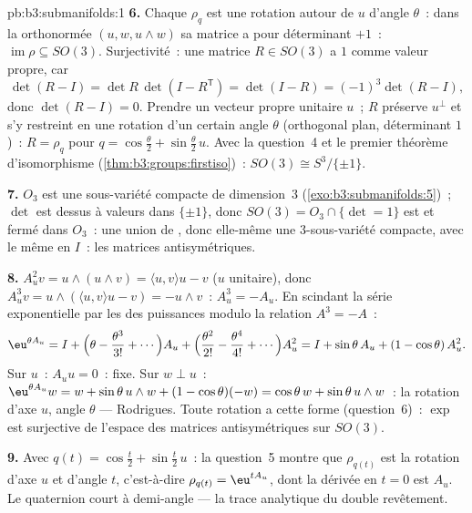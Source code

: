 \begin{solution}{pb:b3:submanifolds:1}
\textbf{6.} Chaque $\rho_q$ est une rotation autour de $u$
d'angle $\theta$~: dans la  orthonormée $(u, w,
u\wedge w)$ sa matrice a pour déterminant $+1$~:
$\operatorname{im}\rho \subseteq SO(3)$. Surjectivité~: une
matrice $R \in SO(3)$ a $1$ comme valeur propre, car
\[
\det(R - I) = \det R\,\det(I - R^{\mathsf T}) = \det(I - R)
= (-1)^3\det(R - I),
\]
donc $\det(R - I) = 0$. Prendre un vecteur propre unitaire
$u$~; $R$ préserve $u^\perp$ et s'y restreint en une
rotation d'un certain angle $\theta$ (orthogonal plan,
déterminant $1$)~: $R = \rho_q$ pour $q =
\cos\frac\theta2 + \sin\frac\theta2\,u$. Avec la question~4
et le premier théorème d'isomorphisme
(\cref{thm:b3:groups:firstiso})~: $SO(3) \cong
S^3/\{\pm1\}$.

\textbf{7.} $O_3$ est une sous-variété compacte de
dimension~$3$ (\cref{exo:b3:submanifolds:5})~; $\det$ est
 dessus à valeurs dans $\{\pm1\}$, donc $SO(3) =
O_3\cap\{\det = 1\}$ est  et fermé dans $O_3$~: une
union de , donc elle-même une
$3$-sous-variété compacte, avec le même  en
$I$~: les matrices antisymétriques.

\textbf{8.} $A_u^2v = u\wedge(u\wedge v) = \langle u,
v\rangle u - v$ ($u$ unitaire), donc $A_u^3v =
u\wedge(\langle u,v\rangle u - v) = -u\wedge v$~: $A_u^3 =
-A_u$. En scindant la série exponentielle par les  des
puissances modulo la relation $A^3 = -A$~:
\[
\eu^{\theta A_u} = I + \Bigl(\theta - \frac{\theta^3}{3!} +
\cdots\Bigr)A_u + \Bigl(\frac{\theta^2}{2!} -
\frac{\theta^4}{4!} + \cdots\Bigr)A_u^2
= I + \sin\theta\,A_u + (1 - \cos\theta)\,A_u^2 .
\]
Sur $u$~: $A_uu = 0$~: fixe. Sur $w \perp u$~:
$\eu^{\theta A_u}w = w + \sin\theta\,u\wedge w + (1 -
\cos\theta)(-w) = \cos\theta\,w + \sin\theta\,u\wedge w$~:
la rotation d'axe $u$, angle $\theta$ --- Rodrigues. Toute
rotation a cette forme (question~6)~: $\exp$ est surjective
de l'espace des matrices antisymétriques sur $SO(3)$.

\textbf{9.} Avec $q(t) = \cos\frac t2 + \sin\frac t2\,u$~:
la question~5 montre que $\rho_{q(t)}$ est la rotation
d'axe $u$ et d'angle $t$, c'est-à-dire $\rho_{q(t)} =
\eu^{tA_u}$, dont la dérivée en $t = 0$ est $A_u$. Le
quaternion court à demi-angle --- la trace analytique du
double revêtement.


\end{solution}
